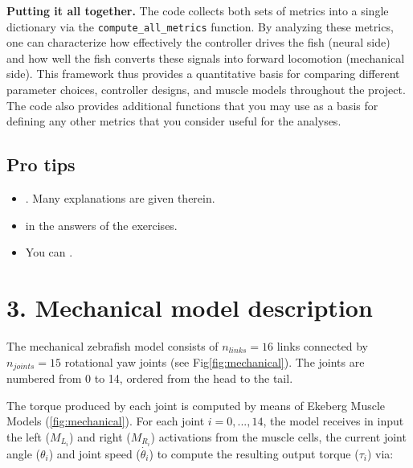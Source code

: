 \documentclass{cmc}
\begin{document}
\noindent
\textbf{Putting it all together.} The code collects both sets of metrics into a single dictionary via the \texttt{compute\_all\_metrics} function. By analyzing these metrics, one can characterize how effectively the controller drives the fish (neural side) and how well the fish converts these signals into forward locomotion (mechanical side). This framework thus provides a quantitative basis for comparing different parameter choices, controller designs, and muscle models throughout the project. The code also provides additional functions that you may use as a basis for defining any other metrics that you consider useful for the analyses.

\subsection*{Pro tips}\label{subsec:tips}

\begin{itemize}
\item {}. Many explanations are given therein.
\item {} in the answers of the exercises.
\item You can .
\end{itemize}



\section*{3. Mechanical model description}\label{sec:mechanical}
The mechanical zebrafish model consists of $n_{links}=16$ links connected by $n_{joints}=15$
rotational yaw joints (see Fig\ref{fig:mechanical}). The joints are numbered from 0 to 14, ordered from the head to the tail.

The torque produced by each joint is computed by means of Ekeberg Muscle Models (\ref{fig:mechanical}).
For each joint $i=0,...,14$, the model receives in input the left ($M_{L_i}$) and right ($M_{R_i}$) activations from the muscle cells, the current joint angle ($\theta_i$) and joint speed ($\Dot{\theta_i}$) to compute the resulting output torque ($\tau_i$) via:
\end{document}
